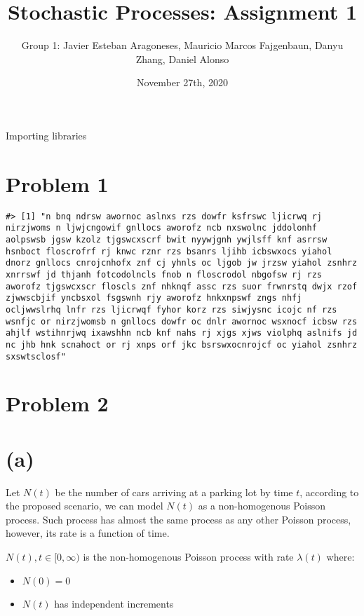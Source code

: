 \documentclass[]{article}
\title{Stochastic Processes: Assignment 1}
\author{Group 1: Javier Esteban Aragoneses, Mauricio Marcos Fajgenbaun, Danyu
Zhang, Daniel Alonso}
\date{November 27th, 2020}
\providecommand{\tightlist}{%
  \setlength{\itemsep}{0pt}\setlength{\parskip}{0pt}}
\begin{document}
\maketitle

Importing libraries

\hypertarget{problem-1}{%
\section{Problem 1}\label{problem-1}}

\begin{verbatim}
#> [1] "n bnq ndrsw awornoc aslnxs rzs dowfr ksfrswc ljicrwq rj nirzjwoms n ljwjcngowif gnllocs aworofz ncb nxswolnc jddolonhf aolpswsb jgsw kzolz tjgswcxscrf bwit nyywjgnh ywjlsff knf asrrsw hsnboct floscrofrf rj knwc rznr rzs bsanrs ljihb icbswxocs yiahol dnorz gnllocs cnrojcnhofx znf cj yhnls oc ljgob jw jrzsw yiahol zsnhrz xnrrswf jd thjanh fotcodolncls fnob n floscrodol nbgofsw rj rzs aworofz tjgswcxscr floscls znf nhknqf assc rzs suor frwnrstq dwjx rzof zjwwscbjif yncbsxol fsgswnh rjy aworofz hnkxnpswf zngs nhfj ocljwwslrhq lnfr rzs ljicrwqf fyhor korz rzs siwjysnc icojc nf rzs wsnfjc or nirzjwomsb n gnllocs dowfr oc dnlr awornoc wsxnocf icbsw rzs ahjlf wstihnrjwq ixawshhn ncb knf nahs rj xjgs xjws violphq aslnifs jd nc jhb hnk scnahoct or rj xnps orf jkc bsrswxocnrojcf oc yiahol zsnhrz sxswtsclosf"
\end{verbatim}

\hypertarget{problem-2}{%
\section{Problem 2}\label{problem-2}}

\hypertarget{a}{%
\section{(a)}\label{a}}

Let \textbf{\(N(t)\)} be the number of cars arriving at a parking lot by
time \textbf{\(t\)}, according to the proposed scenario, we can model
\textbf{\(N(t)\)} as a non-homogenous Poisson process. Such process has
almost the same process as any other Poisson process, however, its rate
is a function of time.

\(N(t), t \in [0, \infty)\) is the non-homogenous Poisson process with
rate \(\lambda (t)\) where:

\begin{itemize}
\tightlist
\item
  \(N(0) = 0\)
\item
  \(N(t)\) has independent increments
\end{itemize}
\end{document}

